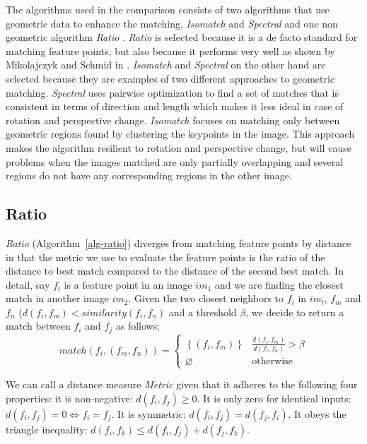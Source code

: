 The algorithms used in the comparison consists of two algorithms that 
use geometric data to enhance the matching, \emph{Isomatch} 
\cite{das2008event} and \emph{Spectral} \cite{leordeanu2005spectral} and 
one non geometric algorithm \emph{Ratio} \cite{lowe2004sift}.  
\emph{Ratio} is selected because it is a de facto standard for matching 
feature points, but also because it performs very well as shown by 
Mikolajczyk and Schmid in \cite{mikolajczyk2005performance}.  
\emph{Isomatch} and \emph{Spectral} on the other hand are selected 
because they are examples of two different approaches to geometric 
matching. \emph{Spectral} uses pairwise optimization to find a set of 
matches that is consistent in terms of direction and length which makes 
it less ideal in case of rotation and perspective change. 
\emph{Isomatch} focuses on matching only between geometric regions found 
by clustering the keypoints in the image.  This approach makes the 
algorithm resilient to rotation and perspective change, but will cause 
problems when the images matched are only partially overlapping and 
several regions do not have any corresponding regions in the other 
image.

\subsection{Ratio}
\label{ss:ratio}

\emph{Ratio} (Algorithm~\ref{alg-ratio}) \cite{lowe2004sift} diverges 
from matching feature points by distance in that the metric we use to 
evaluate the feature points is the ratio of the distance to best match 
compared to the distance of the second best match. In detail, say $f_i$ 
is a feature point in an image $im_1$ and we are finding the closest 
match in another image $im_2$. Given the two closest neighbors to $f_i$ 
in $im_l$, $f_m$ and $f_n$ ($d(f_i,f_m) < similarity(f_i,f_n)$ and a 
threshold $\beta$, we decide to return a match between $f_i$ and $f_j$ 
as follows:
\begin{equation*}
    match(f_i,(f_m,f_n)) = \begin{cases}
        \left\{(f_i,f_m)\right\} &
        \frac{d(f_i,f_m)}{d(f_i,f_n)} > \beta \\ \varnothing & 
        \mbox{otherwise}
    \end{cases}
\end{equation*}


We can call a distance measure \emph{Metric} given that it adheres to 
the following four properties: it is non-negative: $d(f_i,f_j) \geq 0$.  
It is only zero for identical inputs: $d(f_i,f_j) = 0 \Leftrightarrow 
f_i = f_j$. It is symmetric: $d(f_i,f_j) = d(f_j,f_i)$. It obeys the 
triangle inequality: $d(f_i,f_k) \leq d(f_i,f_j) + d(f_j,f_k)$.


